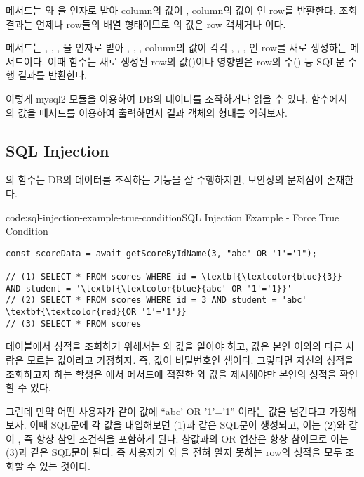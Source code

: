  메서드는 와 을 인자로 받아  column의 값이 ,  column의 값이 인 row를 반환한다. 조회 결과는 언제나 row들의 배열 형태이므로 의 값은 row 객체거나 이다.

 메서드는 , , , 을 인자로 받아 , , ,  column의 값이 각각 , , , 인 row를 새로 생성하는 메서드이다. 이때  함수는 새로 생성된 row의  값()이나 영향받은 row의 수() 등 SQL문 수행 결과를 반환한다.

이렇게 mysql2 모듈을 이용하여 DB의 데이터를 조작하거나 읽을 수 있다.  함수에서 의 값을  메서드를 이용하여 출력하면서 결과 객체의 형태를 익혀보자.

\subsection*{SQL Injection}

의  함수는 DB의 데이터를 조작하는 기능을 잘 수행하지만, 보안상의 문제점이 존재한다.

\begin{codeenv}{code:sql-injection-example-true-condition}{SQL Injection Example - Force True Condition}
\begin{Verbatim}[commandchars=\\\{\}]
const scoreData = await getScoreByIdName(3, "abc' OR '1'='1");

// (1) SELECT * FROM scores WHERE id = \textbf{\textcolor{blue}{3}} AND student = '\textbf{\textcolor{blue}{abc' OR '1'='1}}'
// (2) SELECT * FROM scores WHERE id = 3 AND student = 'abc' \textbf{\textcolor{red}{OR '1'='1'}}
// (3) SELECT * FROM scores
\end{Verbatim}
\end{codeenv}

 테이블에서 성적을 조회하기 위해서는 와  값을 알아야 하고,  값은 본인 이외의 다른 사람은 모르는 값이라고 가정하자. 즉,  값이 비밀번호인 셈이다. 그렇다면 자신의 성적을 조회하고자 하는 학생은 에서  메서드에 적절한 와  값을 제시해야만 본인의 성적을 확인할 수 있다.

그런데 만약 어떤 사용자가 \과 같이  값에 ``abc' OR '1'='1'' 이라는 값을 넘긴다고 가정해보자. 이때 SQL문에 각 값을 대입해보면 (1)과 같은 SQL문이 생성되고, 이는 (2)와 같이 , 즉 항상 참인 조건식을 포함하게 된다. 참값과의 OR 연산은 항상 참이므로 이는 (3)과 같은 SQL문이 된다. 즉 사용자가 와 을 전혀 알지 못하는 row의 성적을 모두 조회할 수 있는 것이다.


